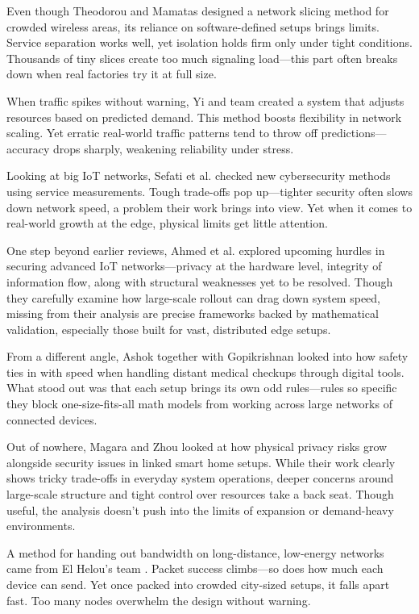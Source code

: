 \documentclass[a4paper,fleqn]{cas-dc}
\numberwithin{equation}{section}
\begin{document}
Even though Theodorou and Mamatas \cite{Theodorou2023DENIS} designed a network slicing method for crowded wireless areas, its reliance on software-defined setups brings limits. Service separation works well, yet isolation holds firm only under tight conditions. Thousands of tiny slices create too much signaling load—this part often breaks down when real factories try it at full size.

When traffic spikes without warning, Yi and team \cite{Yi2024Traffic} created a system that adjusts resources based on predicted demand. This method boosts flexibility in network scaling. Yet erratic real-world traffic patterns tend to throw off predictions—accuracy drops sharply, weakening reliability under stress.

Looking at big IoT networks, Sefati et al. \cite{Sefati2025Comprehensive} checked new cybersecurity methods using service measurements. Tough trade-offs pop up—tighter security often slows down network speed, a problem their work brings into view. Yet when it comes to real-world growth at the edge, physical limits get little attention.

One step beyond earlier reviews, Ahmed et al. \cite{Ahmed2024Toward} explored upcoming hurdles in securing advanced IoT networks—privacy at the hardware level, integrity of information flow, along with structural weaknesses yet to be resolved. Though they carefully examine how large-scale rollout can drag down system speed, missing from their analysis are precise frameworks backed by mathematical validation, especially those built for vast, distributed edge setups.

From a different angle, Ashok together with Gopikrishnan \cite{Ashok2023Statistical} looked into how safety ties in with speed when handling distant medical checkups through digital tools. What stood out was that each setup brings its own odd rules—rules so specific they block one-size-fits-all math models from working across large networks of connected devices.

Out of nowhere, Magara and Zhou \cite{Magara2024Internet} looked at how physical privacy risks grow alongside security issues in linked smart home setups. While their work clearly shows tricky trade-offs in everyday system operations, deeper concerns around large-scale structure and tight control over resources take a back seat. Though useful, the analysis doesn't push into the limits of expansion or demand-heavy environments.

A method for handing out bandwidth on long-distance, low-energy networks came from El Helou's team \cite{ElHelou2024QoS}. Packet success climbs—so does how much each device can send. Yet once packed into crowded city-sized setups, it falls apart fast. Too many nodes overwhelm the design without warning.
\end{document}

